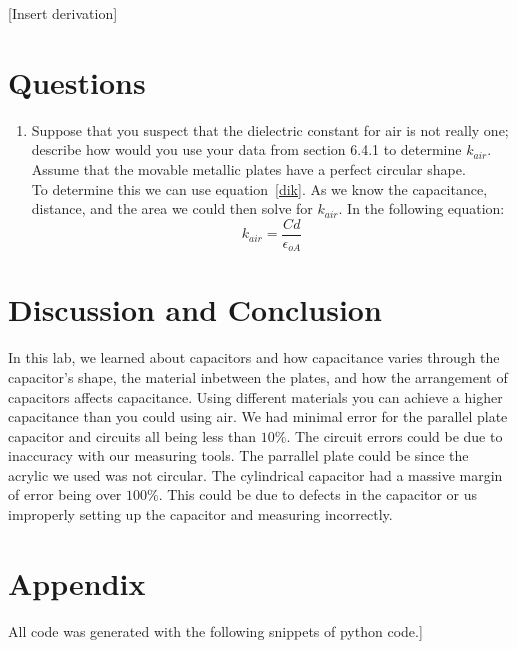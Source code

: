 \documentclass[10pt]{article}
\begin{document}
[Insert derivation]


\section{Questions}
\begin{enumerate}
  \item Suppose that you suspect that the dielectric constant for air is not really one; describe how
  would you use your data from section 6.4.1 to determine $k_{air}$. Assume that the movable
  metallic plates have a perfect circular shape.\\

  To determine this we can use equation~\ref*{dik}. As we know the capacitance, distance, and the area
  we could then solve for $k_{air}$. In the following equation:
  \begin{equation}
    k_{air} = \frac{Cd}{\epsilon_{oA}}
  \end{equation}
\end{enumerate}

\section{Discussion and Conclusion}
In this lab, we learned about capacitors and how capacitance varies through the capacitor's shape,
the material inbetween the plates, and how the arrangement of capacitors affects capacitance. Using 
different materials you can achieve a higher capacitance than you could using air. We had minimal error 
for the parallel plate capacitor and circuits all being less than $10\%$. The circuit errors could be 
due to inaccuracy with our measuring tools. The parrallel plate could be since the acrylic we used 
was not circular. The cylindrical capacitor had a massive margin of error being over $100\%$. This 
could be due to defects in the capacitor or us improperly setting up the capacitor and measuring 
incorrectly.\\
\section*{Appendix}\newpage

All code was generated with the following snippets of python code.]
\end{document}
